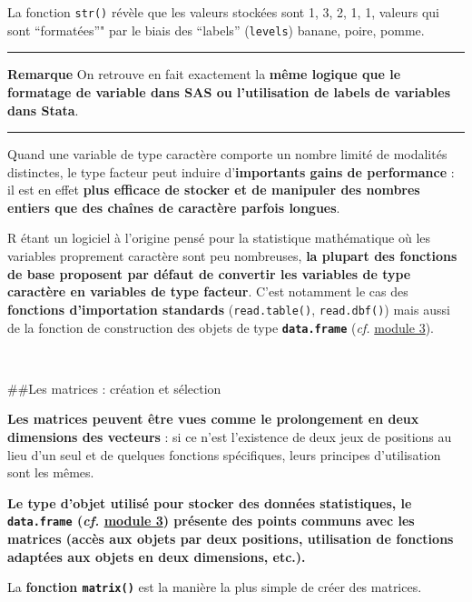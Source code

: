 \documentclass[12pt,twosided, notitlepage]{book}
\begin{document}
La fonction \texttt{str()} révèle que les valeurs stockées sont 1, 3, 2,
1, 1, valeurs qui sont \enquote{formatées}" par le biais des
\enquote{labels} (\texttt{levels}) banane, poire,
pomme.

\begin{center}\rule{0.5\linewidth}{\linethickness}\end{center}

\textbf{Remarque} On retrouve en fait exactement la \textbf{même logique
que le formatage de variable dans SAS ou l'utilisation de labels de
variables dans Stata}.

\begin{center}\rule{0.5\linewidth}{\linethickness}\end{center}

Quand une variable de type caractère comporte un nombre limité de
modalités distinctes, le type facteur peut induire d'\textbf{importants
gains de performance} : il est en effet \textbf{plus efficace de stocker
et de manipuler des nombres entiers que des chaînes de caractère parfois
longues}.

R étant un logiciel à l'origine pensé pour la statistique mathématique
où les variables proprement caractère sont peu nombreuses, \textbf{la
plupart des fonctions de base proposent par défaut de convertir les
variables de type caractère en variables de type facteur}. C'est
notamment le cas des \textbf{fonctions d'importation standards}
(\texttt{read.table()},
\texttt{read.dbf()}) mais aussi de la fonction
de construction des objets de type \textbf{\texttt{data.frame}}
(\emph{cf.} \underline{module 3}).

~

\#\#Les matrices : création et sélection

\textbf{Les matrices peuvent être vues comme le prolongement en deux
dimensions des vecteurs} : si ce n'est l'existence de deux jeux de
positions au lieu d'un seul et de quelques fonctions spécifiques, leurs
principes d'utilisation sont les mêmes.

\textbf{Le type d'objet utilisé pour stocker des données statistiques,
le \texttt{data.frame} (\emph{cf.} \underline{module 3}) présente des
points communs avec les matrices (accès aux objets par deux positions,
utilisation de fonctions adaptées aux objets en deux dimensions, etc.).}

La \textbf{fonction \texttt{matrix()}} est
la manière la plus simple de créer des matrices.
\end{document}
